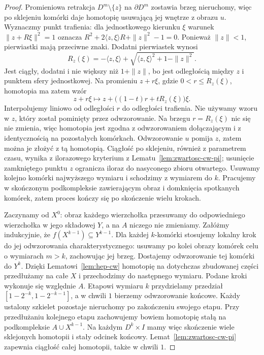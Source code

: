 \begin{proof}
Promieniowa retrakcja $D^m\setminus\{z\}$ na $\partial D^m$
zostawia brzeg nieruchomy, więc po sklejeniu komórki daje homotopię
usuwającą jej wnętrze z obrazu $u$.
Wyznaczmy punkt trafienia: dla jednostkowego kierunku $\xi$
warunek $\|z+R\xi\|^2=1$ oznacza
$R^2+2\langle z,\xi\rangle R+\|z\|^2-1=0$.
Ponieważ $\|z\|<1$, pierwiastki mają przeciwne znaki.
Dodatni pierwiastek wynosi
\[
 R_z(\xi)=-\langle z,\xi\rangle+
 \sqrt{\langle z,\xi\rangle^2+1-\|z\|^2}.
\]
Jest ciągły, dodatni i nie większy niż $1+\|z\|$,
bo jest odległością między $z$ i punktem sfery jednostkowej.
Na promieniu $z+r\xi$, gdzie $0<r\leq R_z(\xi)$,
homotopia ma zatem wzór
\[
 z+r\xi\longmapsto z+\bigl((1-t)r+tR_z(\xi)\bigr)\xi.
\]
Interpolujemy liniowo od odległości $r$ do odległości trafienia.
Nie używamy wzoru w $z$, który został pominięty przez odwzorowanie.
Na brzegu $r=R_z(\xi)$ nic się nie zmienia,
więc homotopia jest zgodna z odwzorowaniem dołączającym
i z identycznością na pozostałych komórkach.
Odwzorowanie $u$ pomija $z$, zatem można je złożyć z tą homotopią.
Ciągłość po sklejeniu, również z parametrem czasu,
wynika z ilorazowego kryterium z Lematu~\ref{lem:zwartosc-cw-pi};
usunięcie zamkniętego punktu $z$ ogranicza iloraz do nasyconego zbioru otwartego.
Usuwamy kolejno komórki najwyższego wymiaru i schodzimy z wymiarem do $k$.
Pracujemy w skończonym podkompleksie zawierającym obraz i domknięcia
spotkanych komórek, zatem proces kończy się po skończenie wielu krokach.

Zaczynamy od $X^0$:
obraz każdego wierzchołka
przesuwamy do odpowiedniego
wierzchołka w jego składowej
$Y$, a na $A$ niczego
nie zmieniamy. Załóżmy
indukcyjnie, że
$f(X^{k-1})\subseteq Y^{k-1}$.
Dla każdej $k$-komórki
stosujemy lokalny krok
do jej odwzorowania
charakterystycznego:
usuwamy po kolei obrazy
komórek celu o wymiarach
$m>k$, zachowując
jej brzeg. Dostajemy
odwzorowanie tej komórki do
$Y^k$. Dzięki
Lematowi~\ref{lem:hep-cw}
homotopię na dotychczas
zbudowanej części
przedłużamy na całe $X$
i przechodzimy do
następnego wymiaru.
Podane kroki wykonuje
się względnie $A$.
Etapowi wymiaru $k$ przydzielamy przedział
$[1-2^{-k},1-2^{-k-1}]$, a w chwili $1$ bierzemy odwzorowanie końcowe.
Każdy ustalony szkielet pozostaje nieruchomy po zakończeniu swojego etapu.
Przy przedłużaniu kolejnego etapu zachowujemy bowiem homotopię stałą
na podkompleksie $A\cup X^{k-1}$.
Na każdym $D^k\times I$ mamy więc skończenie wiele sklejonych homotopii
i stały odcinek końcowy. Lemat~\ref{lem:zwartosc-cw-pi}
zapewnia ciągłość całej homotopii, także w chwili $1$.
\end{proof}

